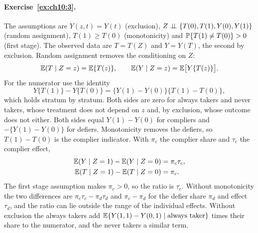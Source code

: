 \paragraph{Exercise~\ref{ex:ch10:3}.} The assumptions are $Y(z, t) = Y(t)$ (exclusion), $Z \perp\!\!\!\perp \{T(0), T(1), Y(0), Y(1)\}$ (random assignment), $T(1) \geq T(0)$ (monotonicity) and $\mathbb{P}\{T(1) \neq T(0)\} > 0$ (first stage). The observed data are $T = T(Z)$ and $Y = Y(T)$, the second by exclusion. Random assignment removes the conditioning on $Z$:
\[
\mathbb{E}(T \mid Z = z) = \mathbb{E}\{T(z)\}, \qquad \mathbb{E}(Y \mid Z = z) = \mathbb{E}\bigl[Y\{T(z)\}\bigr].
\]
For the numerator use the identity
\[
Y\{T(1)\} - Y\{T(0)\} = \{Y(1) - Y(0)\}\{T(1) - T(0)\},
\]
which holds stratum by stratum. Both sides are zero for always takers and never takers, whose treatment does not depend on $z$ and, by exclusion, whose outcome does not either. Both sides equal $Y(1) - Y(0)$ for compliers and $-\{Y(1) - Y(0)\}$ for defiers. Monotonicity removes the defiers, so $T(1) - T(0)$ is the complier indicator. With $\pi_c$ the complier share and $\tau_c$ the complier effect,
\begin{align*}
\mathbb{E}(Y \mid Z = 1) - \mathbb{E}(Y \mid Z = 0) &= \pi_c\tau_c, \\
\mathbb{E}(T \mid Z = 1) - \mathbb{E}(T \mid Z = 0) &= \pi_c.
\end{align*}
The first stage assumption makes $\pi_c > 0$, so the ratio is $\tau_c$. Without monotonicity the two differences are $\pi_c\tau_c - \pi_d\tau_d$ and $\pi_c - \pi_d$ for the defier share $\pi_d$ and effect $\tau_d$, and the ratio can lie outside the range of the individual effects. Without exclusion the always takers add $\mathbb{E}\{Y(1, 1) - Y(0, 1) \mid \text{always taker}\}$ times their share to the numerator, and the never takers a similar term.

